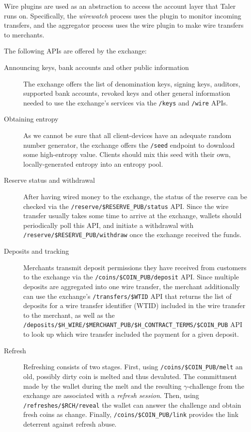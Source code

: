 Wire plugins are used as an abstraction to access the account layer that Taler
runs on.  Specifically, the \textit{wirewatch} process uses the plugin to monitor
incoming transfers, and the aggregator process uses the wire plugin to make
wire transfers to merchants.

The following APIs are offered by the exchange:
\begin{description}
  \item[Announcing keys, bank accounts and other public information]  The
    exchange offers the list of denomination keys, signing keys, auditors,
    supported bank accounts, revoked keys and other general information needed
    to use the exchange's services via the \texttt{/keys} and \texttt{/wire}
    APIs.
  \item[Obtaining entropy] As we cannot be sure that all client-devices have
    an adequate random number generator, the exchange offers the \texttt{/seed}
    endpoint to download some high-entropy value.  Clients should mix this
    seed with their own, locally-generated entropy into an entropy pool.
  \item[Reserve status and withdrawal] After having wired money to the exchange,
    the status of the reserve can be checked via the \texttt{/reserve/\$RESERVE\_PUB/status} API.  Since
    the wire transfer usually takes some time to arrive at the exchange, wallets should periodically
    poll this API, and initiate a withdrawal with \texttt{/reserve/\$RESERVE\_PUB/withdraw} once the exchange received the funds.
  \item[Deposits and tracking]  Merchants transmit deposit permissions they have received from customers
    to the exchange via the \texttt{/coins/\$COIN\_PUB/deposit} API.  Since multiple deposits are aggregated into one wire transfer,
    the merchant additionally can use the exchange's \texttt{/transfers/\$WTID} API that returns the list of deposits for a wire transfer
    identifier (WTID) included in the wire transfer to the merchant, as well as the \texttt{/deposits/\$H\_WIRE/\$MERCHANT\_PUB/\$H\_CONTRACT\_TERMS/\$COIN\_PUB} API to look up
    which wire transfer included the payment for a given deposit.
  \item[Refresh] Refreshing consists of two stages. First, using \texttt{/coins/\$COIN\_PUB/melt} an old, possibly dirty coin is melted and thus devaluted. The committment made by the wallet during the melt and the resulting $\gamma$-challenge from the exchange are associated with a {\em refresh session}.  Then, using \texttt{/refreshes/\$RCH/reveal} the wallet can answer the challenge and obtain fresh coins as change.  Finally, \texttt{/coins/\$COIN\_PUB/link} provides the link deterrent against refresh abuse.

\end{description}
